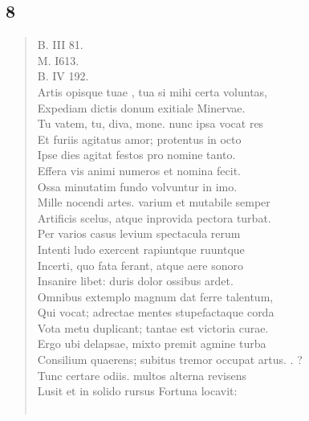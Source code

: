 \documentclass[11pt, a4paper]{report}
\begin{document}
            \subsection*{8}
      \begin{verse}
      B. III 81. \\ M. I613. \\ B. IV 192. \\ Artis opisque  \lbrack tuae \rbrack , tua si mihi certa voluntas, \\ Expediam dictis donum exitiale Minervae. \\ Tu vatem, tu, diva, mone. nunc ipsa vocat res \\ Et furiis agitatus amor; protentus in octo \\ Ipse dies agitat festos pro nomine tanto. \\ Effera vis animi numeros et nomina fecit. \\ Ossa minutatim fundo volvuntur in imo. \\ Mille nocendi artes. varium et mutabile semper \\ Artificis scelus, atque inprovida pectora turbat. \\ Per varios casus levium spectacula rerum \\ Intenti ludo exercent rapiuntque ruuntque \\ Incerti, quo fata ferant, atque aere sonoro \\ Insanire libet: duris dolor ossibus ardet. \\ Omnibus extemplo magnum dat ferre talentum, \\ Qui vocat; adrectae mentes stupefactaque corda \\ Vota metu duplicant; tantae est victoria curae. \\ Ergo ubi delapsae, mixto premit agmine turba \\ Consilium quaerens; subitus tremor occupat artus. . ? \\ Tunc certare odiis. multos alterna revisens \\ Lusit et in solido rursus Fortuna locavit: \\ 
        ﻿\pagebreak 

\end{verse}
\end{document}
